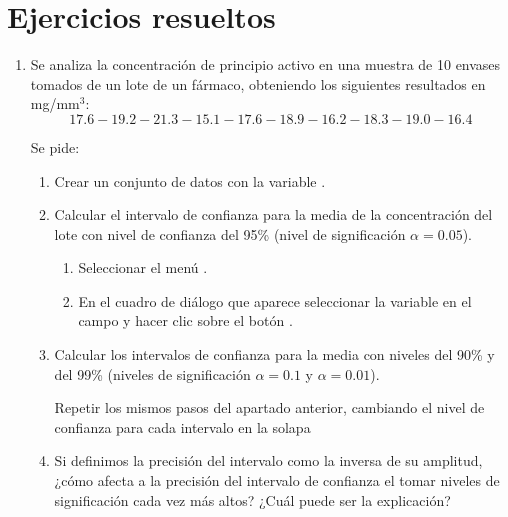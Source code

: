 \section{Ejercicios resueltos}
\begin{enumerate}[leftmargin=*]
\item  Se analiza la concentración de principio activo en una muestra de 10 envases tomados de un lote de un fármaco,
obteniendo los siguientes resultados en mg/mm$^{3}$:
\[
17.6-19.2-21.3-15.1-17.6-18.9-16.2-18.3-19.0-16.4
\]

Se pide:
\begin{enumerate}
\item  Crear un conjunto de datos con la variable .
\item  Calcular el intervalo de confianza para la media de la concentración del lote con nivel de confianza del 95\%
(nivel de significación $\alpha =0.05$).
\begin{indicacion}
\begin{enumerate}
\item Seleccionar el menú .
\item En el cuadro de diálogo que aparece seleccionar la variable  en el campo 
y hacer clic sobre el botón .
\end{enumerate}
\end{indicacion}

\item Calcular los intervalos de confianza para la media con niveles del 90\% y del 99\% (niveles de significación
$\alpha=0.1$ y $\alpha=0.01$).
\begin{indicacion}
Repetir los mismos pasos del apartado anterior, cambiando el nivel de confianza para cada intervalo en la solapa 
\end{indicacion}

\item Si definimos la precisión del intervalo como la inversa de su amplitud, ¿cómo afecta a la precisión del intervalo de confianza el
tomar niveles de significación cada vez más altos? ¿Cuál puede ser la explicación?


\end{enumerate}
\end{enumerate}

